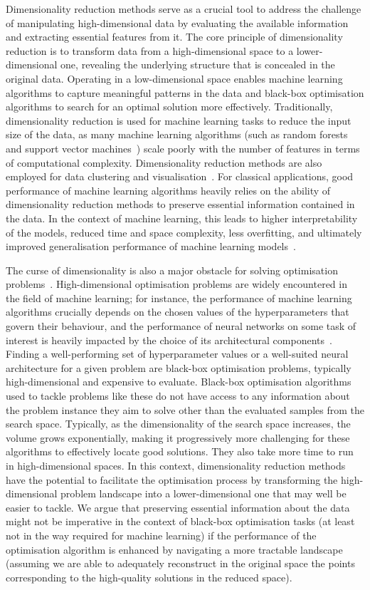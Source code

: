 Dimensionality reduction methods serve as a crucial tool to address the challenge of manipulating high-dimensional data by evaluating the available information and extracting essential features from it.
The core principle of dimensionality reduction is to transform data from a high-dimensional space to a lower-dimensional one, revealing the underlying
structure that is concealed in the original
data.
Operating in a low-dimensional space enables machine learning algorithms to capture meaningful patterns in the data and  black-box optimisation algorithms to search for an optimal solution more effectively.
Traditionally, dimensionality reduction is used for machine learning tasks to reduce the input size of the data, as many machine learning algorithms (such as random forests~\citep{Breiman01} and support vector machines~\citep{CorVap95}) scale poorly with the number of features
in terms of computational complexity.
Dimensionality reduction methods are also employed for data clustering and visualisation~\citep{VanHin08}.
For classical applications, good performance of machine learning algorithms heavily relies on the ability of dimensionality reduction methods to preserve essential
information contained in the data.
In the context of machine learning, this leads to higher interpretability of the models, reduced
time and space complexity, less overfitting, and ultimately improved generalisation performance of machine learning models~\citep{JiaEtAl22}.

The curse of dimensionality is also a major obstacle for solving optimisation problems~\citep{Garnett23}.
High-dimensional optimisation problems are widely encountered in the field of machine learning; for instance, the performance of machine learning algorithms crucially depends on the chosen values of the hyperparameters that govern their behaviour, and the performance of neural networks on some task of interest is heavily impacted by the choice of its architectural components~\cite{ElsEtAl19}.
Finding a well-performing set of hyperparameter values or a well-suited neural architecture for a given problem are  black-box optimisation problems, typically high-dimensional and expensive to evaluate.
Black-box optimisation algorithms used to tackle problems like these
do not have access to any information about the problem instance they aim to solve other than the evaluated samples from the search space.
Typically, as the dimensionality of the search space increases, the volume grows exponentially, making it progressively more challenging for these algorithms to effectively locate good solutions. They also take more time to run in high-dimensional spaces.
In this context, dimensionality reduction methods have the potential to facilitate the optimisation process by transforming the high-dimensional problem landscape into a lower-dimensional one that may well be easier to tackle.
We argue that preserving essential information about the data might not be imperative in the context of  black-box optimisation tasks (at least not in the way required for machine learning) if the performance of the optimisation algorithm is enhanced by navigating a more tractable landscape (assuming we are able to adequately reconstruct in the original space the points corresponding to the high-quality solutions
in the reduced space).

